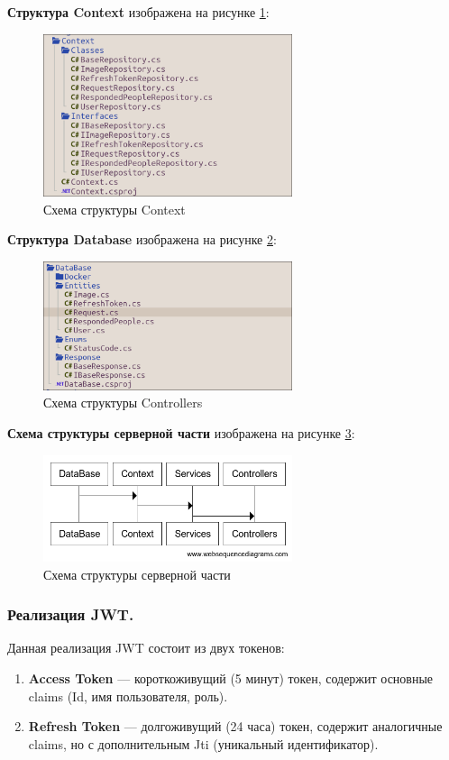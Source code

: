 \textbf{Структура Context} изображена на рисунке \ref{fig:Context}:
\begin{figure}[!h]
    \centering
    \includegraphics[width = 0.65\textwidth]{imgs/Context.png}
    \caption{Схема структуры Context}
    \label{fig:Context}
\end{figure}

\textbf{Структура Database} изображена на рисунке \ref{fig:Database}:
\begin{figure}[!h]
    \centering
    \includegraphics[width = 0.65\textwidth]{imgs/Database.png}
    \caption{Схема структуры Controllers}
    \label{fig:Database}
\end{figure}

\textbf{Схема структуры серверной части} изображена на рисунке \ref{fig:ProjectStructure}:
\begin{figure}[!h]
    \centering
    \includegraphics[width = 0.65\textwidth]{imgs/ProjectStruct.png}
    \caption{Схема структуры серверной части}
    \label{fig:ProjectStructure}
\end{figure}

\subsubsection{Реализация JWT.}
Данная реализация JWT состоит из двух токенов:
\begin{enumerate}
	\item{\textbf{Access Token} --- короткоживущий (5 минут) токен, содержит основные claims (Id, имя пользователя, роль).}
	\item{\textbf{Refresh Token} --- долгоживущий (24 часа) токен, содержит аналогичные claims, но с дополнительным Jti (уникальный идентификатор).}
\end{enumerate}

